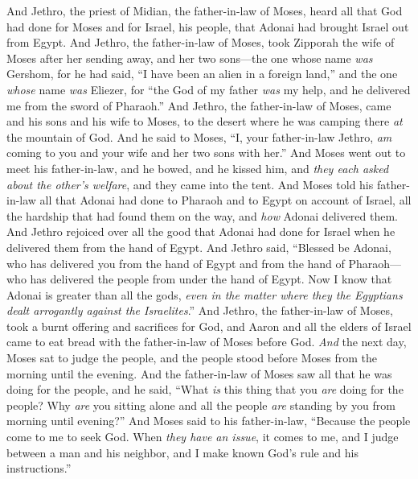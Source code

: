 \begin{biblechapter} %
 And Jethro, the priest of Midian, the father-in-law of Moses, heard all that God had done for Moses and for Israel, his people, that Adonai had brought Israel out from Egypt.
\verse And Jethro, the father-in-law of Moses, took Zipporah the wife of Moses after her sending away,
\verse and her two sons—the one whose name \textit{was} Gershom, for he had said, “I have been an alien in a foreign land,”
\verse and the one \textit{whose} name \textit{was} Eliezer, for “the God of my father \textit{was} my help, and he delivered me from the sword of Pharaoh.”
\verse And Jethro, the father-in-law of Moses, came and his sons and his wife to Moses, to the desert where he was camping there \textit{at} the mountain of God.
\verse And he said to Moses, “I, your father-in-law Jethro, \textit{am} coming to you and your wife and her two sons with her.”
\verse And Moses went out to meet his father-in-law, and he bowed, and he kissed him, and \textit{they each asked about the other’s welfare}, and they came into the tent.
\verse And Moses told his father-in-law all that Adonai had done to Pharaoh and to Egypt on account of Israel, all the hardship that had found them on the way, and \textit{how} Adonai delivered them.
\verse And Jethro rejoiced over all the good that Adonai had done for Israel when he delivered them from the hand of Egypt.
\verse And Jethro said, “Blessed be Adonai, who has delivered you from the hand of Egypt and from the hand of Pharaoh—who has delivered the people from under the hand of Egypt.
\verse Now I know that Adonai is greater than all the gods, \textit{even in the matter where they the Egyptians dealt arrogantly against the Israelites}.”
\verse And Jethro, the father-in-law of Moses, took a burnt offering and sacrifices for God, and Aaron and all the elders of Israel came to eat bread with the father-in-law of Moses before God.
\verse \textit{And} the next day, Moses sat to judge the people, and the people stood before Moses from the morning until the evening.
\verse And the father-in-law of Moses saw all that he was doing for the people, and he said, “What \textit{is} this thing that you \textit{are} doing for the people? Why \textit{are} you sitting alone and all the people \textit{are} standing by you from morning until evening?”
\verse And Moses said to his father-in-law, “Because the people come to me to seek God.
\verse When \textit{they have an issue}, it comes to me, and I judge between a man and his neighbor, and I make known God’s rule and his instructions.”

\end{biblechapter}
